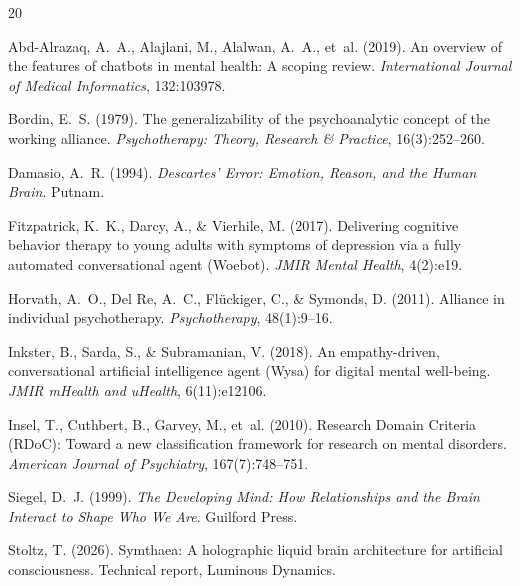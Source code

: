\documentclass[11pt,a4paper]{article}
\begin{document}

\begin{thebibliography}{20}

Abd-Alrazaq, A.~A., Alajlani, M., Alalwan, A.~A., et~al. (2019).
\newblock An overview of the features of chatbots in mental health: A scoping review.
\newblock \emph{International Journal of Medical Informatics}, 132:103978.

Bordin, E.~S. (1979).
\newblock The generalizability of the psychoanalytic concept of the working alliance.
\newblock \emph{Psychotherapy: Theory, Research \& Practice}, 16(3):252--260.

Damasio, A.~R. (1994).
\newblock \emph{Descartes' Error: Emotion, Reason, and the Human Brain}.
\newblock Putnam.

Fitzpatrick, K.~K., Darcy, A., \& Vierhile, M. (2017).
\newblock Delivering cognitive behavior therapy to young adults with symptoms of depression via a fully automated conversational agent (Woebot).
\newblock \emph{JMIR Mental Health}, 4(2):e19.

Horvath, A.~O., Del Re, A.~C., Fl\"{u}ckiger, C., \& Symonds, D. (2011).
\newblock Alliance in individual psychotherapy.
\newblock \emph{Psychotherapy}, 48(1):9--16.

Inkster, B., Sarda, S., \& Subramanian, V. (2018).
\newblock An empathy-driven, conversational artificial intelligence agent (Wysa) for digital mental well-being.
\newblock \emph{JMIR mHealth and uHealth}, 6(11):e12106.

Insel, T., Cuthbert, B., Garvey, M., et~al. (2010).
\newblock Research Domain Criteria (RDoC): Toward a new classification framework for research on mental disorders.
\newblock \emph{American Journal of Psychiatry}, 167(7):748--751.

Siegel, D.~J. (1999).
\newblock \emph{The Developing Mind: How Relationships and the Brain Interact to Shape Who We Are}.
\newblock Guilford Press.

Stoltz, T. (2026).
\newblock Symthaea: A holographic liquid brain architecture for artificial consciousness.
\newblock Technical report, Luminous Dynamics.

\end{thebibliography}
\end{document}

